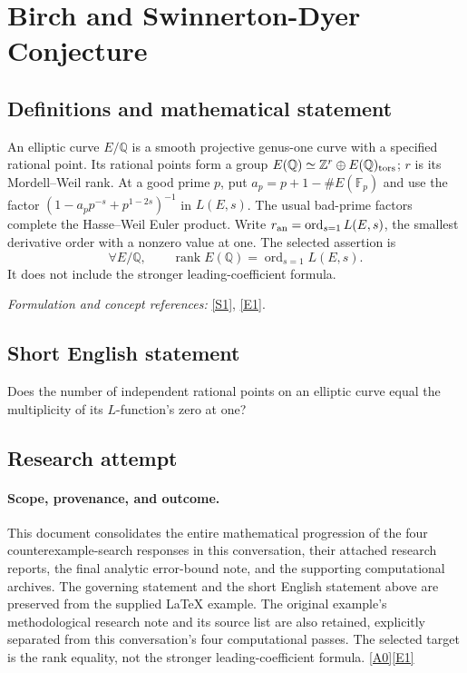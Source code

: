 \documentclass[11pt]{article}
\newcommand{\srcref}[1]{\hyperlink{source:#1}{[#1]}}
\begin{document}
\section*{\texorpdfstring{Birch and Swinnerton-Dyer Conjecture}{Birch and Swinnerton-Dyer Conjecture}}\label{statement}
\subsection{Definitions and mathematical statement}
An elliptic curve $E/{\mathbb{Q}}$ is a smooth projective genus-one curve with a specified rational point. Its rational points form a group $E({\mathbb{Q}})\simeq{\mathbb{Z}}^r\oplus E({\mathbb{Q}})_{\rm tors}$; $r$ is its Mordell--Weil rank. At a good prime $p$, put $a_p=p+1-\#E({\mathbb{F}}_p)$ and use the factor $(1-a_pp^{-s}+p^{1-2s})^{-1}$ in $L(E,s)$. The usual bad-prime factors complete the Hasse--Weil Euler product. Write $r_{\rm an}=\operatorname{ord}_{s=1}L(E,s)$, the smallest derivative order with a nonzero value at one. The selected assertion is
\[
 \forall E/{\mathbb{Q}},\qquad \operatorname{rank}E({\mathbb{Q}})=\operatorname{ord}_{s=1}L(E,s).
\]
It does not include the stronger leading-coefficient formula.
\par\smallskip\textit{Formulation and concept references:} \href{https://www.claymath.org/library/monographs/MPPc.pdf}{[S1]}, \href{https://www.claymath.org/wp-content/uploads/2022/05/birchswin.pdf}{[E1]}.

\subsection{Short English statement}
Does the number of independent rational points on an elliptic curve equal the multiplicity of its $L$-function's zero at one?
\subsection{Research attempt}

\paragraph{Scope, provenance, and outcome.}
This document consolidates the entire mathematical progression of the four
counterexample-search responses in this conversation, their attached research
reports, the final analytic error-bound note, and the supporting computational
archives. The governing statement and the short English statement above are
preserved from the supplied LaTeX example. The original example's methodological
research note and its source list are also retained, explicitly separated from
this conversation's four computational passes. The selected target is the
rank equality, not the stronger leading-coefficient formula. \srcref{A0}\srcref{E1}
\end{document}
